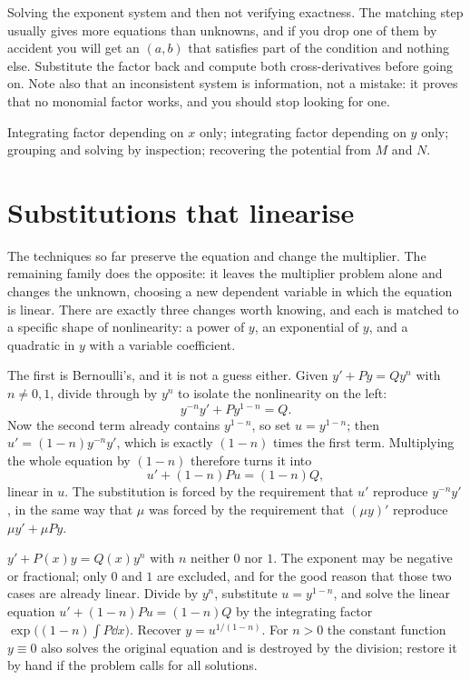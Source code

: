 \begin{trap}
Solving the exponent system and then not verifying exactness. The matching step usually gives more equations than unknowns, and if you drop one of them by accident you will get an $(a,b)$ that satisfies part of the condition and nothing else. Substitute the factor back and compute both cross-derivatives before going on. Note also that an inconsistent system is information, not a mistake: it proves that no monomial factor works, and you should stop looking for one.
\end{trap}

\begin{seealsob}Integrating factor depending on $x$ only; integrating factor depending on $y$ only; grouping and solving by inspection; recovering the potential from $M$ and $N$.\end{seealsob}

\section{Substitutions that linearise}

The techniques so far preserve the equation and change the multiplier. The remaining family does the opposite: it leaves the multiplier problem alone and changes the unknown, choosing a new dependent variable in which the equation is linear. There are exactly three changes worth knowing, and each is matched to a specific shape of nonlinearity: a power of $y$, an exponential of $y$, and a quadratic in $y$ with a variable coefficient.

The first is Bernoulli's, and it is not a guess either. Given $y'+Py=Qy^{n}$ with $n\neq0,1$, divide through by $y^{n}$ to isolate the nonlinearity on the left:
\[y^{-n}y'+Py^{1-n}=Q.\]
Now the second term already contains $y^{1-n}$, so set $u=y^{1-n}$; then $u'=(1-n)y^{-n}y'$, which is exactly $(1-n)$ times the first term. Multiplying the whole equation by $(1-n)$ therefore turns it into
\[u'+(1-n)Pu=(1-n)Q,\]
linear in $u$. The substitution is forced by the requirement that $u'$ reproduce $y^{-n}y'$, in the same way that $\mu$ was forced by the requirement that $(\mu y)'$ reproduce $\mu y'+\mu Py$.

\cue $y'+P(x)y=Q(x)y^{n}$ with $n$ neither $0$ nor $1$. The exponent may be negative or fractional; only $0$ and $1$ are excluded, and for the good reason that those two cases are already linear.
\method Divide by $y^{n}$, substitute $u=y^{1-n}$, and solve the linear equation $u'+(1-n)Pu=(1-n)Q$ by the integrating factor $\exp\bigl((1-n)\int P\dd x\bigr)$. Recover $y=u^{1/(1-n)}$. For $n>0$ the constant function $y\equiv0$ also solves the original equation and is destroyed by the division; restore it by hand if the problem calls for all solutions.

